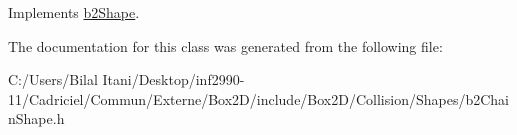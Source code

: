 Implements \hyperlink{classb2_shape_a11996b9bdcf8dca92a0c8bf484ab3f59}{b2\+Shape}.



The documentation for this class was generated from the following file\+:\begin{DoxyCompactItemize}
\item 
C\+:/\+Users/\+Bilal Itani/\+Desktop/inf2990-\/11/\+Cadriciel/\+Commun/\+Externe/\+Box2\+D/include/\+Box2\+D/\+Collision/\+Shapes/b2\+Chain\+Shape.\+h\end{DoxyCompactItemize}

